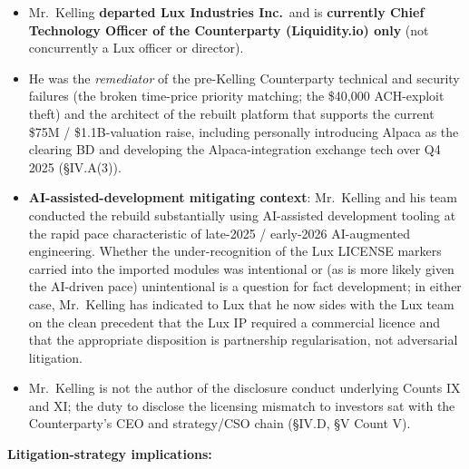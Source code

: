 \documentclass[11pt,letterpaper]{article}
\begin{document}
\begin{itemize}[leftmargin=1.5em,itemsep=0.1em]
\item Mr.\ Kelling \textbf{departed Lux Industries Inc.}\ and is
\textbf{currently Chief Technology Officer of the Counterparty
(Liquidity.io) only} (not concurrently a Lux officer or director).
\item He was the \emph{remediator} of the pre-Kelling Counterparty
technical and security failures (the broken time-price priority
matching; the \$40,000 ACH-exploit theft) and the architect of the
rebuilt platform that supports the current \$75M / \$1.1B-valuation
raise, including personally introducing Alpaca as the clearing BD
and developing the Alpaca-integration exchange tech over Q4 2025
(\S IV.A(3)).
\item \textbf{AI-assisted-development mitigating context}: Mr.\
Kelling and his team conducted the rebuild substantially using
AI-assisted development tooling at the rapid pace characteristic
of late-2025 / early-2026 AI-augmented engineering. Whether the
under-recognition of the Lux LICENSE markers carried into the
imported modules was intentional or (as is more likely given the
AI-driven pace) unintentional is a question for fact development;
in either case, Mr.\ Kelling has indicated to Lux that he now
sides with the Lux team on the clean precedent that the Lux IP
required a commercial licence and that the appropriate disposition
is partnership regularisation, not adversarial litigation.
\item Mr.\ Kelling is not the author of the disclosure conduct
underlying Counts IX and XI; the duty to disclose the licensing
mismatch to investors sat with the Counterparty's CEO and
strategy/CSO chain (\S IV.D, \S V Count V).
\end{itemize}

\textbf{Litigation-strategy implications:}
\end{document}
